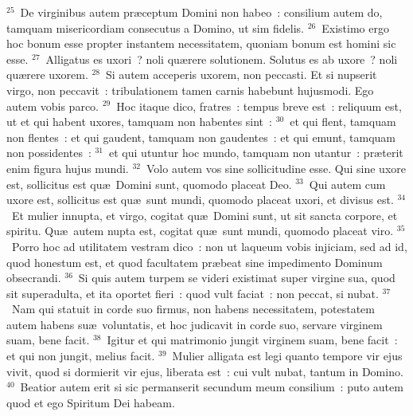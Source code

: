 ${}^{25}$~De virginibus autem pr\ae ceptum Domini non habeo~: consilium autem do, tamquam misericordiam consecutus a Domino, ut sim fidelis.
${}^{26}$~Existimo ergo hoc bonum esse propter instantem necessitatem, quoniam bonum est homini sic esse.
${}^{27}$~Alligatus es uxori~? noli qu\ae rere solutionem. Solutus es ab uxore~? noli qu\ae rere uxorem.
${}^{28}$~Si autem acceperis uxorem, non peccasti. Et si nupserit virgo, non peccavit~: tribulationem tamen carnis habebunt hujusmodi. Ego autem vobis parco.
${}^{29}$~Hoc itaque dico, fratres~: tempus breve est~: reliquum est, ut et qui habent uxores, tamquam non habentes sint~:
${}^{30}$~et qui flent, tamquam non flentes~: et qui gaudent, tamquam non gaudentes~: et qui emunt, tamquam non possidentes~:
${}^{31}$~et qui utuntur hoc mundo, tamquam non utantur~: pr\ae terit enim figura hujus mundi.
${}^{32}$~Volo autem vos sine sollicitudine esse. Qui sine uxore est, sollicitus est qu\ae\ Domini sunt, quomodo placeat Deo.
${}^{33}$~Qui autem cum uxore est, sollicitus est qu\ae\ sunt mundi, quomodo placeat uxori, et divisus est.
${}^{34}$~Et mulier innupta, et virgo, cogitat qu\ae\ Domini sunt, ut sit sancta corpore, et spiritu. Qu\ae\ autem nupta est, cogitat qu\ae\ sunt mundi, quomodo placeat viro.
${}^{35}$~Porro hoc ad utilitatem vestram dico~: non ut laqueum vobis injiciam, sed ad id, quod honestum est, et quod facultatem pr\ae beat sine impedimento Dominum obsecrandi.
${}^{36}$~Si quis autem turpem se videri existimat super virgine sua, quod sit superadulta, et ita oportet fieri~: quod vult faciat~: non peccat, si nubat.
${}^{37}$~Nam qui statuit in corde suo firmus, non habens necessitatem, potestatem autem habens su\ae\ voluntatis, et hoc judicavit in corde suo, servare virginem suam, bene facit.
${}^{38}$~Igitur et qui matrimonio jungit virginem suam, bene facit~: et qui non jungit, melius facit.
${}^{39}$~Mulier alligata est legi quanto tempore vir ejus vivit, quod si dormierit vir ejus, liberata est~: cui vult nubat, tantum in Domino.
${}^{40}$~Beatior autem erit si sic permanserit secundum meum consilium~: puto autem quod et ego Spiritum Dei habeam.

